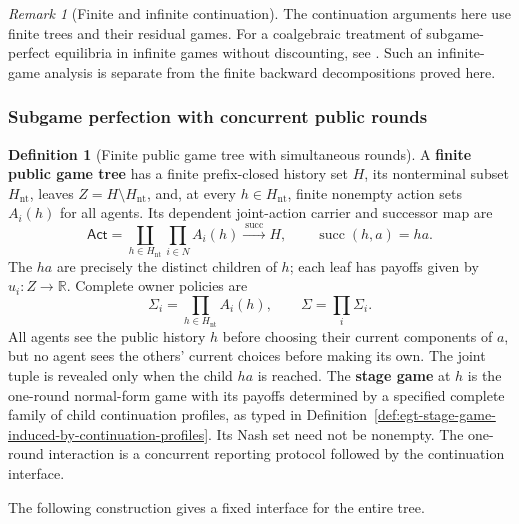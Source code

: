 \documentclass[11pt,a4paper]{article}
\numberwithin{equation}{section}
\theoremstyle{definition}
\newtheorem{definition}[theorem]{Definition}
\theoremstyle{remark}
\newtheorem{remark}[theorem]{Remark}
\theoremstyle{plain}
\begin{document}
\begin{remark}[Finite and infinite continuation]
The continuation arguments here use finite trees and their residual games.
For a coalgebraic treatment of subgame-perfect equilibria in infinite games
without discounting, see \citet{AbramskyWinschel2013}. Such an infinite-game
analysis is separate from the finite backward decompositions proved here.
\end{remark}

\subsubsection{Subgame perfection with concurrent public rounds}

\begin{definition}[Finite public game tree with simultaneous rounds]
\label{def:egt-finite-public-game-tree-with-simultaneous-rounds}
A \textbf{finite public game tree} has a finite prefix-closed history
set $H$, its nonterminal subset $H_{\mathrm{nt}}$, leaves
$Z=H\setminus H_{\mathrm{nt}}$, and, at every
$h\in H_{\mathrm{nt}}$, finite nonempty action sets $A_i(h)$ for all
agents. Its dependent joint-action carrier and successor map are
\[
 \mathsf{Act}=
 \coprod_{h\in H_{\mathrm{nt}}}\prod_{i\in N}A_i(h)
 \xrightarrow{\ \operatorname{succ}\ }H,\qquad
 \operatorname{succ}(h,a)=ha.
\]
The $ha$ are precisely the distinct children of $h$; each leaf has
payoffs given by $u_i:Z\to\mathbb R$. Complete owner policies are
\[
 \Sigma_i=\prod_{h\in H_{\mathrm{nt}}}A_i(h),\qquad
 \Sigma=\prod_i\Sigma_i.
\]
All agents see the public history $h$ before choosing their current
components of $a$, but no agent sees the others' current choices
before making its own. The joint tuple is revealed only when the
child $ha$ is reached. The \textbf{stage game} at $h$ is the one-round
normal-form game with its payoffs determined by a specified complete
family of child continuation profiles, as typed in
Definition~\ref{def:egt-stage-game-induced-by-continuation-profiles}.
Its Nash set need not be nonempty. The one-round interaction is a
concurrent reporting protocol followed by the continuation interface.
\end{definition}
The following construction gives a fixed interface for the entire tree.
\end{document}
